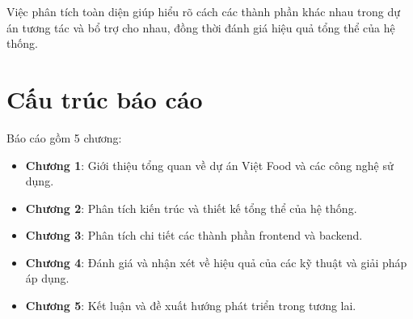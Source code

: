 Việc phân tích toàn diện giúp hiểu rõ cách các thành phần khác nhau trong dự án tương tác và bổ trợ cho nhau, đồng thời đánh giá hiệu quả tổng thể của hệ thống.

\section{Cấu trúc báo cáo}
Báo cáo gồm 5 chương:
\begin{itemize}
    \item \textbf{Chương 1}: Giới thiệu tổng quan về dự án Việt Food và các công nghệ sử dụng.
    \item \textbf{Chương 2}: Phân tích kiến trúc và thiết kế tổng thể của hệ thống.
    \item \textbf{Chương 3}: Phân tích chi tiết các thành phần frontend và backend.
    \item \textbf{Chương 4}: Đánh giá và nhận xét về hiệu quả của các kỹ thuật và giải pháp áp dụng.
    \item \textbf{Chương 5}: Kết luận và đề xuất hướng phát triển trong tương lai.
\end{itemize}
